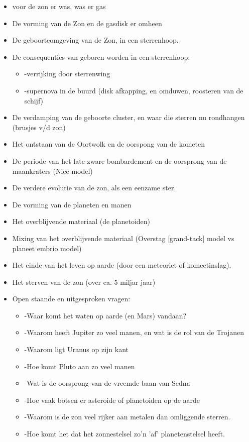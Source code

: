 \documentclass[11pt,fleqn]{book} %
\begin{document}
   
\begin{itemize} 
\item voor de zon er was, was er gas
\item De vorming van de Zon en de gasdisk er omheen
\item De geboorteomgeving van de Zon, in een sterrenhoop.
\item De consequenties van geboren worden in een sterrenhoop:
  \begin{itemize} 
  \item    -verrijking door sterrenwing
  \item    -supernova in de buurd (disk afkapping, en omduwen, roosteren van de schijf)
  \end{itemize} 
\item De verdamping van de geboorte cluster, en waar die sterren nu rondhangen (brusjes v/d zon)
\item Het ontstaan van de Oortwolk en de oorspong van de kometen
\item De periode van het late-zware bombardement en de oorsprong van de maankraters (Nice model)
\item De verdere evolutie van de zon, als een eenzame ster.
\item De vorming van de planeten en manen
\item Het overblijvende materiaal (de planetoiden)
\item Mixing van het overblijvende materiaal (Overstag [grand-tack] model vs planeet embrio model)
\item Het einde van het leven op aarde (door een meteoriet of komeetinslag).
\item Het sterven van de zon (over ca. 5 miljar jaar)
\end{itemize}

\begin{itemize}
\item Open staande en uitgesproken vragen:
  \begin{itemize}
  \item -Waar komt het waten op aarde (en Mars) vandaan?
  \item -Waarom heeft Jupiter zo veel manen, en wat is de rol van de Trojanen
  \item -Waarom ligt Uranus op zijn kant
  \item -Hoe komt Pluto aan zo veel manen
  \item -Wat is de oorsprong van de vreemde baan van Sedna
  \item -Hoe vaak botsen er asteroide of planetoiden op de aarde
  \item -Waarom is de zon veel rijker aan metalen dan omliggende sterren.
  \item -Hoe komt het dat het zonnestelsel zo'n 'af' planetenstelsel heeft.
  \end{itemize}
\end{itemize}
\end{document}
